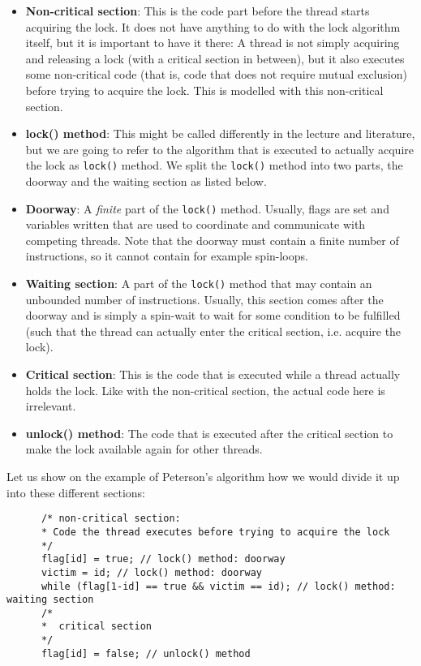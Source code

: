 \documentclass{article}
\begin{document}
    \begin{itemize}
      \item \textbf{Non-critical section}: This is the code part before the thread starts acquiring the lock. It does not have anything to do with the lock algorithm itself, but it is important to have it there: A thread is not simply acquiring and releasing a lock (with a critical section in between), but it also executes some non-critical code (that is, code that does not require mutual exclusion) before trying to acquire the lock. This is modelled with this non-critical section.
      \item \textbf{lock() method}: This might be called differently in the lecture and literature, but we are going to refer to the algorithm that is executed to actually acquire the lock as \texttt{lock()} method. We split the \texttt{lock()} method into two parts, the doorway and the waiting section as listed below.
      \item \textbf{Doorway}: A \textit{finite} part of the \texttt{lock()} method. Usually, flags are set and variables written that are used to coordinate and communicate with competing threads. Note that the doorway must contain a finite number of instructions, so it cannot contain for example spin-loops.
      \item \textbf{Waiting section}: A part of the \texttt{lock()} method that may contain an unbounded number of instructions. Usually, this section comes after the doorway and is simply a spin-wait to wait for some condition to be fulfilled (such that the thread can actually enter the critical section, i.e. acquire the lock).
      \item \textbf{Critical section}: This is the code that is executed while a thread actually holds the lock. Like with the non-critical section, the actual code here is irrelevant.
      \item \textbf{unlock() method}: The code that is executed after the critical section to make the lock available again for other threads.
    \end{itemize}

    \noindent Let us show on the example of Peterson's algorithm how we would divide it up into these different sections:

    \begin{verbatim}
      /* non-critical section:
      * Code the thread executes before trying to acquire the lock
      */
      flag[id] = true; // lock() method: doorway
      victim = id; // lock() method: doorway
      while (flag[1-id] == true && victim == id); // lock() method: waiting section
      /*
      *  critical section
      */
      flag[id] = false; // unlock() method
    \end{verbatim}
\end{document}
